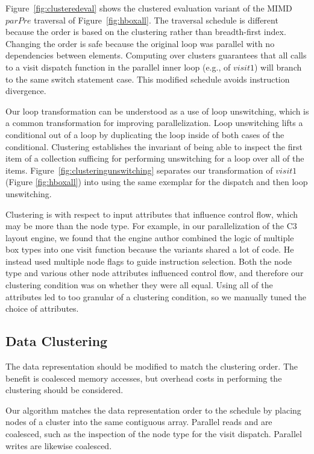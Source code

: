 Figure~\ref{fig:clusteredeval} shows the clustered evaluation variant of the MIMD $parPre$ traversal of Figure~\ref{fig:hboxall}. The traversal schedule is different because the order is based on the clustering rather than breadth-first index. Changing the order is safe because the original loop was parallel with no dependencies between elements.  Computing over clusters guarantees that all calls to a visit dispatch function in the parallel inner loop (e.g., of $visit1$) will branch to the same switch statement case. This modified schedule avoids instruction divergence. 

Our loop transformation can be understood as a use of loop unswitching, which is a common transformation for improving parallelization. Loop unswitching lifts a conditional out of a loop by duplicating the  loop inside of both cases of the conditional. Clustering establishes the invariant of being able to inspect the first item of a collection sufficing for performing unswitching for a loop over all of the items. Figure~\ref{fig:clusteringunswitching} separates our transformation of $visit1$ (Figure \ref{fig:hboxall}) into using the same exemplar for the dispatch and then loop unswitching.

Clustering is with respect to input attributes that influence control flow, which may be more than the node type. For example, in our parallelization of the C3 layout engine, we found that the engine author combined the logic of multiple box types into one visit function because the variants shared a lot of code. He instead used multiple node flags to guide instruction selection. Both the node type and various other node attributes influenced control flow, and therefore our clustering condition was on whether they were all equal. Using all of the attributes led to too granular of a clustering condition, so we manually tuned the choice of attributes.

\subsection{Data Clustering}
The data representation should be modified to match the clustering order. The benefit is coalesced memory accesses, but overhead costs in performing the clustering should be considered.

Our algorithm matches the data representation order to the schedule by placing nodes of a cluster into the same contiguous array. Parallel reads and are coalesced, such as the inspection of the node type for the visit dispatch. Parallel writes are likewise coalesced.

